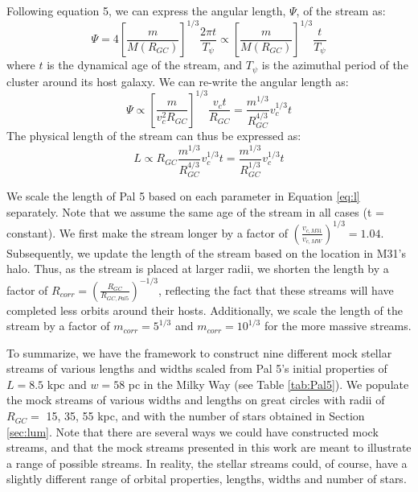 \documentclass[twocolumn]{aastex62}
\newcommand{\todo}[1]{{\color{red} TODO: #1}}
\begin{document}
Following \citet{johnston01} equation 5, we can express the angular length, $\Psi$, of the stream as:
\begin{equation}
\Psi = 4  \left[\frac{m}{M(R_{GC})}\right]^{1/3}  \frac{2 \pi t}{T_{\psi}} \propto \left[\frac{m}{M(R_{GC})}\right]^{1/3}  \frac{t}{T_{\psi}}
\end{equation}
where $t$ is the dynamical age of the stream, and $T_{\psi}$ is the azimuthal period of the cluster around its host galaxy. We can re-write the angular length as:
\begin{equation}
\Psi \propto \left[\frac{m }{v_c^2 R_{GC}}\right]^{1/3}  \frac{v_c t }{R_{GC}} = \frac{m^{1/3}}{R_{GC}^{4/3}} v_c^{1/3}t
\end{equation}
The physical length of the stream can thus be expressed as:
\begin{equation}
\label{eq:l}
L \propto R_{GC} \frac{m^{1/3}}{R_{GC}^{4/3}} v_c^{1/3}t = \frac{m^{1/3}}{R_{GC}^{1/3}} v_c^{1/3}t
\end{equation}

We scale the length of Pal 5 based on each parameter in Equation \ref{eq:l} separately. Note that we assume the same age of the stream in all cases (t = constant). We first make the stream longer by a factor of $(\frac{v_{c,M31}}{v_{c,MW}})^{1/3} = 1.04$. Subsequently, we update the length of the stream based on the location in M31's halo. Thus, as the stream is placed at larger radii, we shorten the length by a factor of  $R_{corr} = \left(\frac{R_{GC}}{R_{GC,Pal5}}\right)^{-1/3}$, reflecting the fact that these streams will have completed less orbits around their hosts. %
Additionally, we scale the length of the stream by a factor of $m_{corr} = 5^{1/3}$ and $m_{corr} = 10^{1/3}$ for the more massive streams. 

To summarize, we have the framework to construct nine different mock stellar streams of various lengths and widths scaled from Pal 5's initial properties of $L = 8.5$ kpc and $w = 58$ pc in the Milky Way (see Table \ref{tab:Pal5}). We populate the mock streams of various widths and lengths on great circles with radii of $R_{GC} =$ 15, 35, 55 kpc, and with the number of stars obtained in Section \ref{sec:lum}. Note that there are several ways we could have constructed mock streams, and that the mock streams presented in this work are meant to illustrate a range of possible streams. In reality, the stellar streams could, of course, have a slightly different range of orbital properties, lengths, widths and number of stars.
\end{document}
